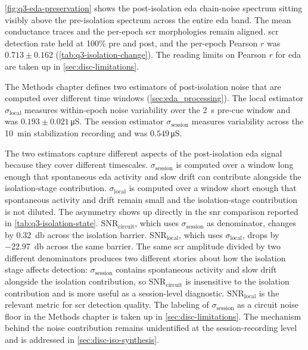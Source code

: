 \autoref{fig:q3-eda-preservation} shows the post-isolation \gls{eda} chain-noise spectrum sitting visibly above the pre-isolation spectrum across the entire \gls{eda} band. The mean conductance traces and the per-epoch \gls{scr} morphologies remain aligned. \gls{scr} detection rate held at 100\% pre and post, and the per-epoch Pearson \(r\) was $\num{0.713} \pm \num{0.162}$ (\autoref{tab:q3-isolation-change}). The reading limits on Pearson \(r\) for \gls{eda} are taken up in \autoref{sec:disc-limitations}.

The Methods chapter defines two estimators of post-isolation noise that are computed over different time windows (\autoref{sec:eda_processing}). The local estimator $\sigma_{\mathrm{local}}$ measures within-epoch noise variability over the \SI{2}{\second} pre-cue window and was $\num{0.193} \pm \num{0.021}$\,\si{\micro\siemens}. The session estimator $\sigma_{\mathrm{session}}$ measures variability across the \SI{10}{\minute} stabilization recording and was $\num{0.549}$\,\si{\micro\siemens}.

The two estimators capture different aspects of the post-isolation \gls{eda} signal because they cover different timescales. $\sigma_{\mathrm{session}}$ is computed over a window long enough that spontaneous \gls{eda} activity and slow drift can contribute alongside the isolation-stage contribution. $\sigma_{\mathrm{local}}$ is computed over a window short enough that spontaneous activity and drift remain small and the isolation-stage contribution is not diluted. The asymmetry shows up directly in the \gls{snr} comparison reported in \autoref{tab:q3-isolation-state}. \(\mathrm{SNR}_{\mathrm{circuit}}\), which uses $\sigma_{\mathrm{session}}$ as denominator, changes by \SI{+0.32}{\decibel} across the isolation barrier. \(\mathrm{SNR}_{\mathrm{local}}\), which uses $\sigma_{\mathrm{local}}$, drops by \SI{-22.97}{\decibel} across the same barrier. The same \gls{scr} amplitude divided by two different denominators produces two different stories about how the isolation stage affects detection: $\sigma_{\mathrm{session}}$ contains spontaneous activity and slow drift alongside the isolation contribution, so \(\mathrm{SNR}_{\mathrm{circuit}}\) is insensitive to the isolation contribution and is more useful as a session-level diagnostic. \(\mathrm{SNR}_{\mathrm{local}}\) is the relevant metric for \gls{scr} detection quality. The labeling of $\sigma_{\mathrm{session}}$ as a circuit noise floor in the Methods chapter is taken up in \autoref{sec:disc-limitations}. The mechanism behind the noise contribution remains unidentified at the session-recording level and is addressed in \autoref{sec:disc-iso-synthesis}.

